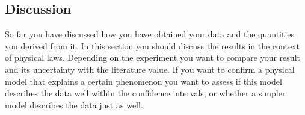 \subsection{Discussion}

So far you have discussed how you have obtained your data and the
quantities you derived from it. In this section you should discuss
the results in the context of physical laws. Depending on the
experiment you want to compare your result and its uncertainty with
the literature value. If you want to confirm a physical model that
explains a certain phenomenon you want to assess if this model
describes the data well within the confidence intervals, or whether
a simpler model describes the data just as well.